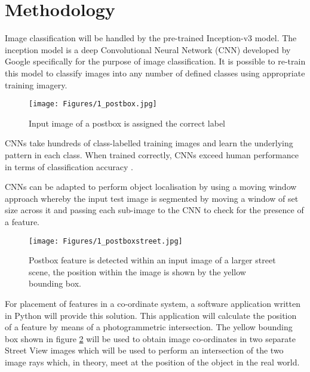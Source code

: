 \section{Methodology}
Image classification will be handled by the pre-trained Inception-v3 model. The inception model is a deep Convolutional Neural Network (CNN) developed by Google specifically for the purpose of image classification. It is possible to re-train this model to classify images into any number of defined classes using appropriate training imagery.

\begin{figure}[!ht]
\centering
\texttt{[image: Figures/1\_postbox.jpg]}
\decoRule
\caption[Post Box Classification]{Input image of a postbox is assigned the correct label}
\label{fig:postbox}
\end{figure}

CNNs take hundreds of class-labelled training images and learn the underlying pattern in each class. When trained correctly, CNNs exceed human performance in terms of classification accuracy \parencite{convolution1}.

CNNs can be adapted to perform object localisation by using a moving window approach whereby the input test image is segmented by moving a window of set size across it and passing each sub-image to the CNN to check for the presence of a feature.

\begin{figure}[!ht]
\centering
\texttt{[image: Figures/1\_postboxstreet.jpg]}
\decoRule
\caption[Post Box Localisation]{Postbox feature is detected within an input image of a larger street scene, the position within the image is shown by the yellow bounding box.}
\label{fig:postbox2}
\end{figure}

For placement of features in a co-ordinate system, a software application written in Python will provide this solution. This application will calculate the position of a feature by means of a photogrammetric intersection. The yellow bounding box shown in figure \ref{fig:postbox2} will be used to obtain image co-ordinates in two separate Street View images which will be used to perform an intersection of the two image rays which, in theory, meet at the position of the object in the real world.

